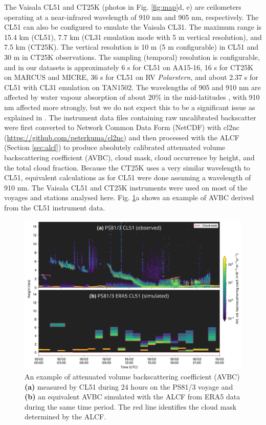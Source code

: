 \documentclass[12pt,a4paper]{article}
\begin{document}
The Vaisala CL51 and CT25K (photos in Fig. \ref{fig:map}d, e) are ceilometers
operating at a near-infrared wavelength of 910 nm and 905 nm, respectively.
The CL51 can also be configured to emulate the Vaisala CL31. The maximum range
is 15.4 km (CL51), 7.7 km (CL31 emulation mode with 5 m vertical resolution),
and 7.5 km (CT25K). The vertical resolution is 10 m (5 m configurable) in CL51
and 30 m in CT25K observations. The sampling (temporal) resolution is
configurable, and in our datasets is approximately 6 s for CL51 on AA15‐16, 16
s for CT25K on MARCUS and MICRE, 36 s for CL51 on RV \emph{Polarstern}, and
about 2.37 s for CL51 with CL31 emulation on TAN1502. The wavelengths of 905
and 910 nm are affected by water vapour absorption of about 20\% in the
mid-latitudes \citep{wiegner2015,wiegner2019}, with 910 nm affected more
strongly, but we do not expect this to be a significant issue as explained in
\cite{kuma2021}.  The instrument data files containing raw uncalibrated
backscatter were first converted to Network Common Data Form (NetCDF) with
cl2nc (\url{https://github.com/peterkuma/cl2nc}) and then processed with the
ALCF (Section \ref{sec:alcf}) to produce absolutely calibrated attenuated
volume backscattering coefficient (AVBC), cloud mask, cloud occurrence by
height, and the total cloud fraction. Because the CT25K uses a very similar
wavelength to CL51, equivalent calculations as for CL51 were done assuming a
wavelength of 910 nm. The Vaisala CL51 and CT25K instruments were used on most
of the voyages and stations analysed here. Fig.  \ref{fig:example}a shows an
example of AVBC derived from the CL51 instrument data.

\begin{figure}[b!]
\centering
\includegraphics[width=\textwidth]{img/example.png}
\caption{
An example of attenuated volume backscattering coefficient (AVBC) \textbf{(a)}
measured by CL51 during 24 hours on the PS81/3 voyage and \textbf{(b)} an
equivalent AVBC simulated with the ALCF from ERA5 data during the same time
period. The red line identifies the cloud mask determined by the ALCF.
}
\label{fig:example}
\end{figure}
\end{document}
